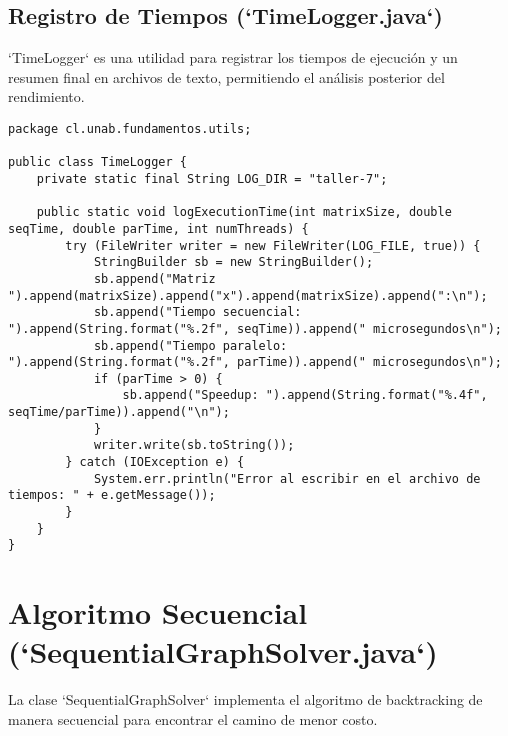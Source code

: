 \documentclass[12pt]{article}
\begin{document}
\subsection*{Registro de Tiempos (`TimeLogger.java`)}
`TimeLogger` es una utilidad para registrar los tiempos de ejecución y un resumen final en archivos de texto, permitiendo el análisis posterior del rendimiento.
\begin{lstlisting}[caption={Fragmento de `TimeLogger.java`}, morekeywords={FileWriter, IOException, LocalDateTime, DateTimeFormatter}]
package cl.unab.fundamentos.utils;

public class TimeLogger {
    private static final String LOG_DIR = "taller-7";

    public static void logExecutionTime(int matrixSize, double seqTime, double parTime, int numThreads) {
        try (FileWriter writer = new FileWriter(LOG_FILE, true)) {
            StringBuilder sb = new StringBuilder();
            sb.append("Matriz ").append(matrixSize).append("x").append(matrixSize).append(":\n");
            sb.append("Tiempo secuencial: ").append(String.format("%.2f", seqTime)).append(" microsegundos\n");
            sb.append("Tiempo paralelo: ").append(String.format("%.2f", parTime)).append(" microsegundos\n");
            if (parTime > 0) {
                sb.append("Speedup: ").append(String.format("%.4f", seqTime/parTime)).append("\n");
            }
            writer.write(sb.toString());
        } catch (IOException e) {
            System.err.println("Error al escribir en el archivo de tiempos: " + e.getMessage());
        }
    }
}
\end{lstlisting}

\section*{Algoritmo Secuencial (`SequentialGraphSolver.java`)}
La clase `SequentialGraphSolver` implementa el algoritmo de backtracking de manera secuencial para encontrar el camino de menor costo.
\end{document}
